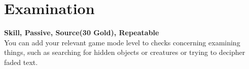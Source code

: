 \section{Examination}\label{sec:examination}
\textbf{Skill, Passive, Source(30 Gold), Repeatable}\\
You can add your relevant game mode level to checks concerning examining things, such as searching for hidden objects or creatures or trying to decipher faded text.